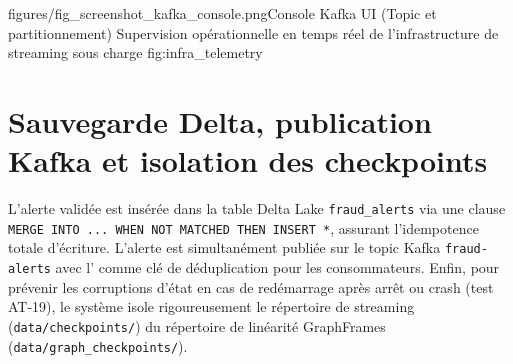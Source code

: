 %
{figures/fig_screenshot_kafka_console.png}{Console Kafka UI (Topic et partitionnement)}%
{Supervision opérationnelle en temps réel de l'infrastructure de streaming sous charge}%
{fig:infra_telemetry}

\section{Sauvegarde Delta, publication Kafka et isolation des checkpoints}

L'alerte validée est insérée dans la table Delta Lake \texttt{fraud\_alerts} via une clause \texttt{MERGE INTO ... WHEN NOT MATCHED THEN INSERT *}, assurant l'idempotence totale d'écriture. L'alerte est simultanément publiée sur le topic Kafka \texttt{fraud-alerts} avec l'\alertID{} comme clé de déduplication pour les consommateurs. Enfin, pour prévenir les corruptions d'état en cas de redémarrage après arrêt ou crash (test AT-19), le système isole rigoureusement le répertoire de streaming (\texttt{data/checkpoints/}) du répertoire de linéarité GraphFrames (\texttt{data/graph\_checkpoints/}).

\newpage
